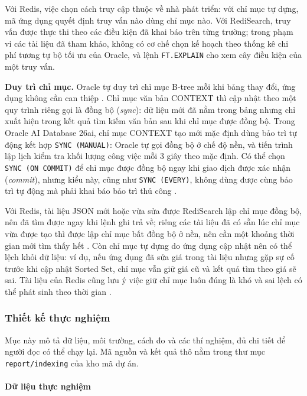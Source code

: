 Với Redis, việc chọn cách truy cập thuộc về nhà phát triển: với chỉ mục tự dựng, mã ứng dụng quyết định truy vấn nào dùng chỉ mục nào. Với RediSearch, truy vấn được thực thi theo các điều kiện đã khai báo trên từng trường; trong phạm vi các tài liệu đã tham khảo, không có cơ chế chọn kế hoạch theo thống kê chi phí tương tự bộ tối ưu của Oracle, và lệnh \texttt{FT.EXPLAIN} cho xem cây điều kiện của một truy vấn.

\noindent\textbf{Duy trì chỉ mục.} Oracle tự duy trì chỉ mục B-tree mỗi khi bảng thay đổi, ứng dụng không cần can thiệp \cite{oracleIndexes}. Chỉ mục văn bản CONTEXT thì cập nhật theo một quy trình riêng gọi là đồng bộ (\emph{sync}): dữ liệu mới đã nằm trong bảng nhưng chỉ xuất hiện trong kết quả tìm kiếm văn bản sau khi chỉ mục được đồng bộ. Trong Oracle AI Database 26ai, chỉ mục CONTEXT tạo mới mặc định dùng bảo trì tự động kết hợp \texttt{SYNC (MANUAL)}: Oracle tự gọi đồng bộ ở chế độ nền, và tiến trình lập lịch kiểm tra khối lượng công việc mỗi 3 giây theo mặc định. Có thể chọn \texttt{SYNC (ON COMMIT)} để chỉ mục được đồng bộ ngay khi giao dịch được xác nhận (\emph{commit}), nhưng kiểu này, cũng như \texttt{SYNC (EVERY)}, không dùng được cùng bảo trì tự động mà phải khai báo bảo trì thủ công \cite{oracleTextAutoMaintenance}.

Với Redis, tài liệu JSON mới hoặc vừa sửa được RediSearch lập chỉ mục đồng bộ, nên đã tìm được ngay khi lệnh ghi trả về; riêng các tài liệu đã có sẵn lúc chỉ mục vừa được tạo thì được lập chỉ mục bất đồng bộ ở nền, nên cần một khoảng thời gian mới tìm thấy hết \cite{redisJsonIndexing}. Còn chỉ mục tự dựng do ứng dụng cập nhật nên có thể lệch khỏi dữ liệu: ví dụ, nếu ứng dụng đã sửa giá trong tài liệu nhưng gặp sự cố trước khi cập nhật Sorted Set, chỉ mục vẫn giữ giá cũ và kết quả tìm theo giá sẽ sai. Tài liệu của Redis cũng lưu ý việc giữ chỉ mục luôn đúng là khó và sai lệch có thể phát sinh theo thời gian \cite{redisSecondaryIndexing}.

\subsubsection{Thiết kế thực nghiệm}\label{sec:ix-design}

Mục này mô tả dữ liệu, môi trường, cách đo và các thí nghiệm, đủ chi tiết để người đọc có thể chạy lại. Mã nguồn và kết quả thô nằm trong thư mục \texttt{report/indexing} của kho mã dự án.

\paragraph{Dữ liệu thực nghiệm}\label{sec:ix-data}

